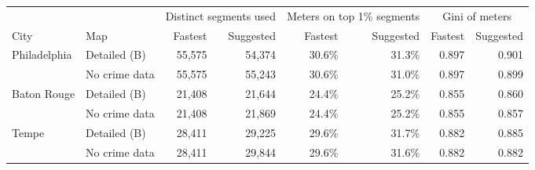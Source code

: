 \begin{tabular}{llrrrrrr}
\toprule
 & & \multicolumn{2}{c}{Distinct segments used} & \multicolumn{2}{c}{Meters on top 1\% segments} & \multicolumn{2}{c}{Gini of meters} \\
City & Map & Fastest & Suggested & Fastest & Suggested & Fastest & Suggested \\
\midrule
Philadelphia & Detailed (B) & 55,575 & 54,374 & 30.6\% & 31.3\% & 0.897 & 0.901 \\
 & No crime data & 55,575 & 55,243 & 30.6\% & 31.0\% & 0.897 & 0.899 \\
\midrule
Baton Rouge & Detailed (B) & 21,408 & 21,644 & 24.4\% & 25.2\% & 0.855 & 0.860 \\
 & No crime data & 21,408 & 21,869 & 24.4\% & 25.2\% & 0.855 & 0.857 \\
\midrule
Tempe & Detailed (B) & 28,411 & 29,225 & 29.6\% & 31.7\% & 0.882 & 0.885 \\
 & No crime data & 28,411 & 29,844 & 29.6\% & 31.6\% & 0.882 & 0.882 \\
\bottomrule
\end{tabular}
